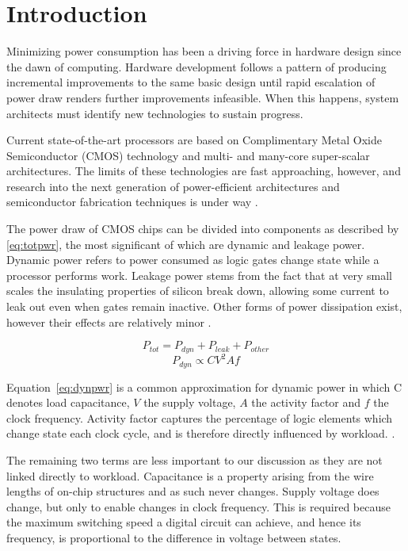 \section{Introduction}

Minimizing power consumption has been a driving force in hardware design since the dawn of computing. Hardware development follows a pattern of producing incremental improvements to the same basic design until rapid escalation of power draw renders further improvements infeasible. When this happens, system architects must identify new technologies to sustain progress.

Current state-of-the-art processors are based on Complimentary Metal Oxide Semiconductor (CMOS) technology and multi- and many-core super-scalar architectures. The limits of these technologies are fast  approaching, however, and research into the next generation of power-efficient architectures and semiconductor fabrication techniques is under way \cite{esmaeilzadeh:2011aa}.

The power draw of CMOS chips can be divided into components as described by \autoref{eq:totpwr}, the most significant of which are dynamic and leakage power. Dynamic power refers to power consumed as logic gates change state while a processor performs work. Leakage power stems from the fact that at very small scales the insulating properties of silicon break down, allowing some current to leak out even when gates remain inactive. Other forms of power dissipation exist, however their effects are relatively minor \cite{kaxiras:2008aa}.


\begin{equation}
\label{eq:totpwr}
P_{tot} = P_{dyn} + P_{leak} + P_{other}
\end{equation}
\begin{equation} 
\label{eq:dynpwr}
P_{dyn} \propto CV^{2}Af
\end{equation}

Equation~\ref{eq:dynpwr} is a common approximation for dynamic power in which C denotes load capacitance, $V$ the supply voltage, $A$ the activity factor and $f$ the clock frequency. Activity factor captures the percentage of logic elements which change state each clock cycle, and is therefore directly influenced by workload. .


The remaining two terms are less important to our discussion as they are not linked directly to workload. Capacitance is a property arising from the wire lengths of on-chip structures and as such never changes. Supply voltage does change, but only to enable changes in clock frequency. This is required because the maximum switching speed a digital circuit can achieve, and hence its frequency, is proportional to the difference in voltage between states.

